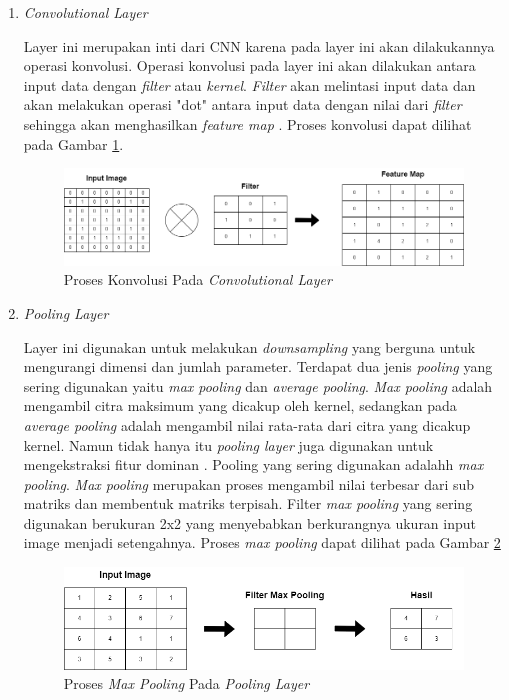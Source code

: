 \begin{enumerate}
  \item \textit{Convolutional Layer} \par
  Layer ini merupakan inti dari CNN karena pada layer ini akan dilakukannya operasi konvolusi. Operasi konvolusi pada layer ini akan dilakukan antara input data dengan \textit{filter} atau \textit{kernel}. \textit{Filter} akan melintasi input data dan akan melakukan operasi "dot" antara input data dengan nilai dari \textit{filter} sehingga akan menghasilkan \textit{feature map} \parencite{convolusi}. Proses konvolusi dapat dilihat pada Gambar \ref{fig:konvolusilayer}. 

  \begin{figure}[!h]
    \centering
    \includegraphics[width=1\linewidth]{../Gambar/konvolusilayer.png}
    \caption{Proses Konvolusi Pada \emph{Convolutional Layer}}
    \label{fig:konvolusilayer}
  \end{figure}
  
  \item \textit{Pooling Layer} \par
  Layer ini digunakan untuk melakukan \textit{downsampling} yang berguna untuk mengurangi dimensi dan jumlah parameter. Terdapat dua jenis \textit{pooling} yang sering digunakan yaitu \textit{max pooling} dan  \textit{average pooling}. \textit{Max pooling} adalah mengambil citra maksimum yang dicakup oleh kernel, sedangkan pada \textit{average pooling} adalah mengambil nilai rata-rata dari citra yang dicakup kernel. Namun tidak hanya itu \textit{pooling layer} juga digunakan untuk mengekstraksi fitur dominan \parencite{Bukusakti}. Pooling yang sering digunakan adalahh \emph{max pooling}. \emph{Max pooling} merupakan proses mengambil nilai terbesar dari sub matriks dan membentuk matriks terpisah. Filter \emph{max pooling} yang sering digunakan berukuran 2x2 yang menyebabkan berkurangnya ukuran input image menjadi setengahnya. Proses \emph{max pooling} dapat dilihat pada Gambar \ref{fig:poolinglayer}

  \begin{figure}[!h]
    \centering
    \includegraphics[width=1\linewidth]{../Gambar/maxpooling.png}
    \caption{Proses \emph{Max Pooling} Pada \emph{Pooling Layer}}
    \label{fig:poolinglayer}
  \end{figure}


\end{enumerate}
